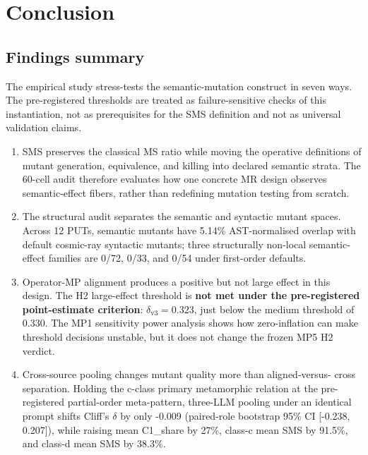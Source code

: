 \documentclass[manuscript,screen,review]{acmart}
\begin{document}


\section{Conclusion}\label{conclusion}

\subsection{Findings summary}\label{findings-summary}

The empirical study stress-tests the semantic-mutation construct in seven
ways. The pre-registered thresholds are treated as failure-sensitive
checks of this instantiation, not as prerequisites for the SMS
definition and not as universal validation claims.

\begin{enumerate}
\item
  SMS preserves the classical MS ratio while moving the operative
  definitions of mutant generation, equivalence, and killing into
  declared semantic strata. The 60-cell audit therefore evaluates how
  one concrete MR design observes semantic-effect fibers, rather than
  redefining mutation testing from scratch.
\item
  The structural audit separates the semantic and syntactic mutant
  spaces. Across 12 PUTs, semantic mutants have 5.14\% AST-normalised
  overlap with default cosmic-ray syntactic mutants; three structurally
  non-local semantic-effect families are 0/72, 0/33, and 0/54 under
  first-order defaults.
\item
  Operator-MP alignment produces a positive but not large effect in this
  design. The H2 large-effect threshold is \textbf{not met under the
  pre-registered point-estimate criterion}: \(\delta_{\mathrm{v3}} =
  0.323\), just below the \citet{romano2006cliff} medium threshold of
  0.330. The MP1 sensitivity power analysis shows how zero-inflation can
  make threshold decisions unstable, but it does not change the frozen
  MP5 H2 verdict.
\item
  Cross-source pooling changes mutant quality more than aligned-versus-
  cross separation. Holding the c-class primary metamorphic relation at
  the pre-registered partial-order meta-pattern, three-LLM pooling under
  an identical prompt
  shifts Cliff's \(\delta\) by only -0.009 (paired-role bootstrap 95\%
  CI {[}-0.238, 0.207{]}), while
  raising mean C1\_share by 27\%, class-c mean SMS by 91.5\%, and
  class-d mean SMS by 38.3\%.

\end{enumerate}
\end{document}
